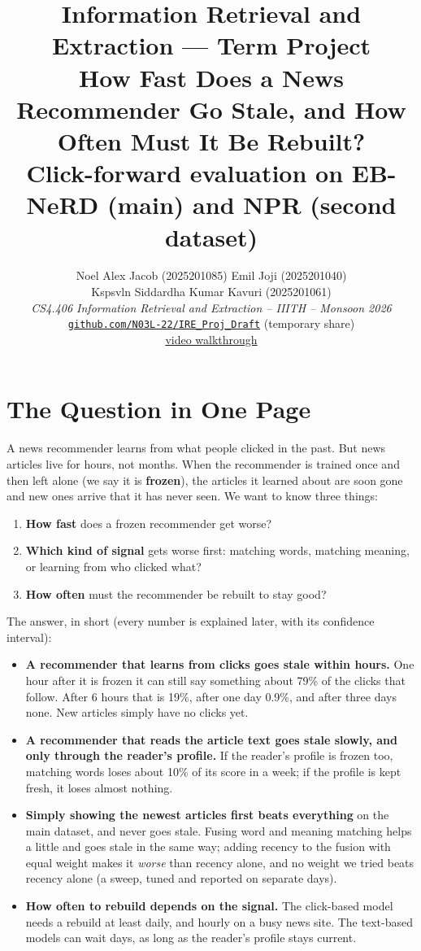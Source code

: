 \documentclass[11pt,a4paper]{article}
\title{\textbf{Information Retrieval and Extraction --- Term Project}\\
       \large How Fast Does a News Recommender Go Stale, and How Often Must It Be Rebuilt?\\
       \normalsize Click-forward evaluation on EB-NeRD (main) and NPR (second dataset)}
\author{%
  Noel Alex Jacob (2025201085) \quad Emil Joji (2025201040) \\[1pt] Kspsvln Siddardha Kumar Kavuri (2025201061) \\[2pt]
  {\footnotesize \textit{CS4.406 Information Retrieval and Extraction -- IIITH -- Monsoon 2026}} \\[2pt]
  {\footnotesize \href{https://github.com/N03L-22/IRE_Proj_Draft}{\texttt{github.com/N03L-22/IRE\_Proj\_Draft}} (temporary share)} \\[1pt]
  {\footnotesize \href{https://iiithydstudents-my.sharepoint.com/:f:/g/personal/kspsvlnsiddardha_k_students_iiit_ac_in/IgAkzfh2iVh8Q7G_a_I2dOG-Abb17vASNM5Lf02P7EXHisI?e=9iryaa}{video walkthrough}}}
\date{}
\newcommand{\term}[1]{\textbf{#1}}
\begin{document}
\maketitle
\setcounter{tocdepth}{1}
\tableofcontents
\vspace{-4pt}

\section{The Question in One Page}
A news recommender learns from what people clicked in the past. But news articles live for hours, not months. When the recommender is trained once and then left alone (we say it is \term{frozen}), the articles it learned about are soon gone and new ones arrive that it has never seen. We want to know three things:
\begin{enumerate}
\item \textbf{How fast} does a frozen recommender get worse?
\item \textbf{Which kind of signal} gets worse first: matching words, matching meaning, or learning from who clicked what?
\item \textbf{How often} must the recommender be rebuilt to stay good?
\end{enumerate}
The answer, in short (every number is explained later, with its confidence interval):
\begin{itemize}
\item \textbf{A recommender that learns from clicks goes stale within hours.} One hour after it is frozen it can still say something about 79\% of the clicks that follow. After 6 hours that is 19\%, after one day 0.9\%, and after three days none. New articles simply have no clicks yet.
\item \textbf{A recommender that reads the article text goes stale slowly, and only through the reader's profile.} If the reader's profile is frozen too, matching words loses about 10\% of its score in a week; if the profile is kept fresh, it loses almost nothing.
\item \textbf{Simply showing the newest articles first beats everything} on the main dataset, and never goes stale. Fusing word and meaning matching helps a little and goes stale in the same way; adding recency to the fusion with equal weight makes it \emph{worse} than recency alone, and no weight we tried beats recency alone (a sweep, tuned and reported on separate days).
\item \textbf{How often to rebuild depends on the signal.} The click-based model needs a rebuild at least daily, and hourly on a busy news site. The text-based models can wait days, as long as the reader's profile stays current.
\end{itemize}
\end{document}
